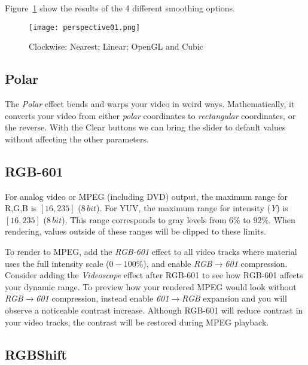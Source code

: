 Figure~\ref{fig:perspective01} show the results of the 4 different smoothing options.

\begin{figure}[hbtp]
    \centering
    \texttt{[image: perspective01.png]}
    \caption{Clockwise: Nearest; Linear; OpenGL and Cubic}
    \label{fig:perspective01}
\end{figure}

\subsection{Polar}%
\label{sub:polar}

The \textit{Polar} effect bends and warps your video in weird ways. Mathematically, it converts your video from either \textit{polar} coordinates to \textit{rectangular} coordinates, or the reverse. With the Clear buttons we can bring the slider to default values without affecting the other parameters.

\subsection{RGB-601}%
\label{sub:rgb-601}

For analog video or MPEG (including DVD) output, the maximum range for R,G,B is $[16,235]$ ($8\,bit$). For YUV, the maximum range for intensity (\textit{Y}) is $[16, 235]$ ($8\,bit$). This range corresponds to gray levels from $6\%$ to $92\%$. When rendering, values outside of these ranges will be clipped to these limits.

To render to MPEG, add the \textit{RGB-601} effect to all video tracks where material uses the full intensity scale ($0-100\%$), and enable \textit{RGB$\rightarrow$601} compression. Consider adding the \textit{Videoscope} effect after RGB-601 to see how RGB-601 affects your dynamic range. To preview how your rendered MPEG would look without \textit{RGB$\rightarrow$601} compression, instead enable \textit{601$\rightarrow$RGB} expansion and you will observe a noticeable contrast increase. Although RGB-601 will reduce contrast in your video tracks, the contrast will be restored during MPEG playback.

\subsection{RGBShift}%
\label{sub:rgb-shift}

